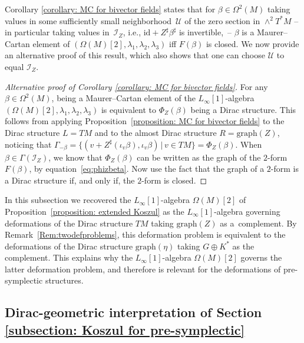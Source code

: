 \documentclass[10pt,a4paper]{amsart}
\numberwithin{equation}{section}
\renewcommand{\graph}{\mathrm{graph}}
\renewcommand{\graph}{\mathrm{graph}}
\begin{document}
Corollary \ref{corollary: MC for bivector fields} states that for $\beta \in\Omega^2(M)$ taking values in some sufficiently small neighbor\-hood~$\mathcal{U}$ of the zero section in $\wedge^2 T^*M$ -- in particular taking values in~$\mathcal{I}_Z$, i.e., $\mathrm{id} + Z^\sharp \beta^\sharp$ is invertible,~-- $\beta$ is a Maurer--Cartan element of $(\Omega(M)[2],\lambda_1,\lambda_2,\lambda_3)$ if{f} $F(\beta)$
is closed. We now provide an alternative proof of this result, which also shows that one can choose $\mathcal{U}$ to equal $\mathcal{I}_Z$.

\begin{proof}[Alternative proof of Corollary \ref{corollary: MC for bivector fields}] For {any $\beta\in\Omega^2(M)$}, being a Maurer--Cartan element of the $L_{\infty}[1]$-algebra $(\Omega(M)[2],\lambda_1,\lambda_2,\lambda_3)$ is equivalent to $\Phi_Z(\beta)$ being a Dirac structure. This follows from applying Proposition~\ref{proposition: MC for bivector fields} to the Dirac structure $L=TM$ and to the almost Dirac structure $R=\mathrm{graph}(Z)$, noticing that $\Gamma_{-\beta}=\{(v+Z^\sharp(\iota_v\beta),\iota_v\beta)\,|\,v\in TM\}=\Phi_Z(\beta)$. When $\beta\in\Gamma(\mathcal{I}_Z)$, we know that $\Phi_Z(\beta)$ can be written as the graph of the $2$-form $F(\beta)$, by equation~\eqref{eq:phizbeta}. Now use the fact that the graph of a $2$-form is a Dirac structure if, and only if, the $2$-form is closed.
\end{proof}

\begin{Remark}In this subsection we recovered the $L_\infty[1]$-algebra {$\Omega(M)[2]$} of Proposition~\ref{proposition: extended Koszul} as the $L_\infty[1]$-algebra governing deformations of the Dirac structure $TM$ taking $\graph(Z)$ as a~complement. By Remark~\ref{Rem:twodefproblems}, this deformation problem is equivalent to the deformations of the Dirac structure $\mathrm{graph}(\eta)$ taking $G\oplus K^*$ as the complement. This explains why the $L_\infty[1]$-algebra {$\Omega(M)[2]$} governs the latter deformation problem, and therefore is relevant for the deformations of pre-symplectic structures.
\end{Remark}

\subsection{Dirac-geometric interpretation of Section \ref{subsection: Koszul for pre-symplectic}}\label{subsection: presymplintegr}
\end{document}

